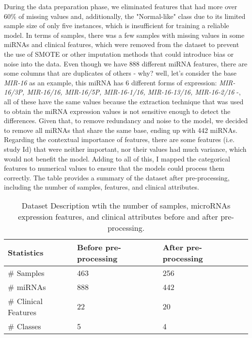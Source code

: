 During the data preparation phase, we eliminated features that had more over
60\% of missing values and, additionally, the "Normal-like" class due to its
limited sample size of only five instances, which is insufficient for training
a reliable model. In terms of samples, there was a few samples with missing
values in some miRNAs and clinical features, which were removed from the
dataset to prevent the use of SMOTE or other imputation methods that could
introduce bias or noise into the data. Even though we have 888 different miRNA
features, there are some columns that are duplicates of others - why? well,
let’s consider the base \textit{MIR-16} as an example, this miRNA has 6
different forms of expression: \textit{MIR-16/3P, MIR-16/16, MIR-16/5P,
  MIR-16-1/16, MIR-16-13/16, MIR-16-2/16} -, all of these have the same values
because the extraction technique that was used to obtain the miRNA expression
values is not sensitive enough to detect the differences. Given that, to remove
redundancy and noise to the model, we decided to remove all miRNAs that share
the same base, ending up with 442 miRNAs. Regarding the contextual importance
of features, there are some features (i.e. study Id) that were neither
important, nor their values had much variance, which would not benefit the
model. Adding to all of this, I mapped the categorical features to numerical
values to ensure that the models could process them correctly. The table
provides a summary of the dataset after pre-processing, including the number of
samples, features, and clinical attributes.

\begin{table}[h]
  \centering
  \caption{Dataset Description wtih the number of samples, microRNAs expression features, and clinical attributes before and after pre-processing.}

  \begin{tabular}{|l|l|l|l|}
    \hline
    \textbf{Statistics}  & \textbf{Before pre-processing} & \textbf{After pre-processing} \\ \hline
    \# Samples           & 463                            & 256                           \\ \hline
    \# miRNAs            & 888                            & 442 \footnotemark[1]          \\ \hline
    \# Clinical Features & 22                             & 20                            \\ \hline
    \# Classes           & 5                              & 4 \footnotemark[1]            \\ \hline
  \end{tabular}
  \label{tab:dataset_description}
\end{table}

